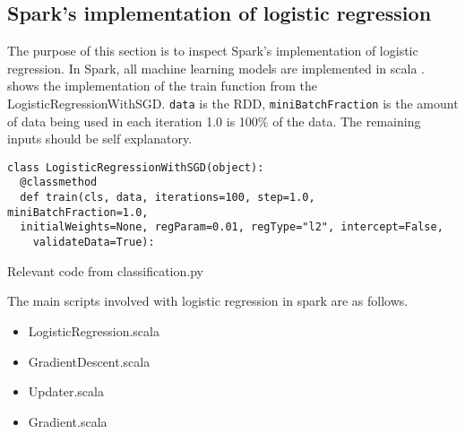 \subsection{Spark's implementation of logistic regression}\label{sec:sparklogreg}
The purpose of this section is to inspect Spark’s implementation of logistic regression.
In Spark, all machine learning models are implemented in scala \cite{sparkml}. shows the implementation of the train function from the LogisticRegressionWithSGD. \texttt{data} is the RDD, \texttt{miniBatchFraction} is the amount of data being used in each iteration 1.0 is 100\% of the data. The remaining inputs should be self explanatory.   
\begin{listing}[H]
\begin{verbatim}
class LogisticRegressionWithSGD(object):
  @classmethod
  def train(cls, data, iterations=100, step=1.0, miniBatchFraction=1.0,
  initialWeights=None, regParam=0.01, regType="l2", intercept=False,
    validateData=True):
\end{verbatim}
\caption{Relevant code from classification.py}
\label{lst:py_logreg}
\end{listing}
The main scripts involved with logistic regression in spark are as follows.
\begin{itemize}
\item LogisticRegression.scala
\item GradientDescent.scala
\item Updater.scala
\item Gradient.scala
\end{itemize}

